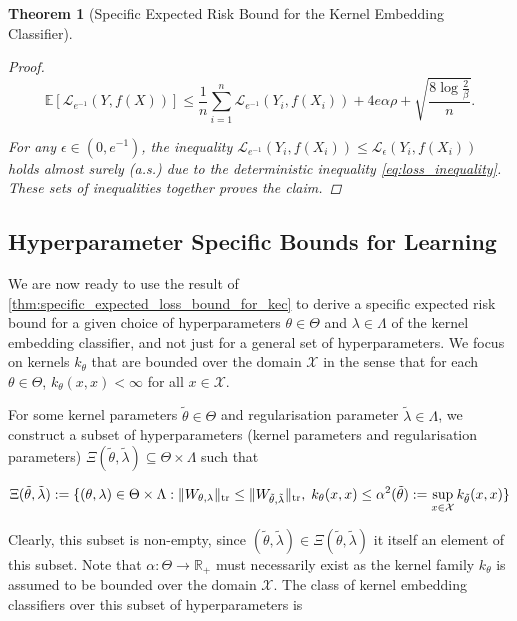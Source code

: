 \documentclass{article}
\newtheorem{theorem}{Theorem}[section]
\begin{document}
\begin{theorem}[Specific Expected Risk Bound for the Kernel Embedding Classifier]
\begin{proof}
				\begin{equation}
					\mathbb{E}[\mathcal{L}_{e^{-1}}(Y, f(X))] \leq \frac{1}{n} \sum_{i = 1}^{n} \mathcal{L}_{e^{-1}}(Y_{i}, f(X_{i})) + 4 e \alpha \rho + \sqrt{\frac{8 \log{\frac{2}{\beta}}}{n}}.
				\end{equation}
				
				For any $\epsilon \in (0, e^{-1})$, the inequality $\mathcal{L}_{e^{-1}}(Y_{i}, f(X_{i})) \leq \mathcal{L}_{\epsilon}(Y_{i}, f(X_{i}))$ holds almost surely (a.s.) due to the deterministic inequality \eqref{eq:loss_inequality}. These sets of inequalities together proves the claim.
			\end{proof}
		\end{theorem}

	\subsection{Hyperparameter Specific Bounds for Learning}
	\label{sec:hyperparamter_bounds}
	
		We are now ready to use the result of \cref{thm:specific_expected_loss_bound_for_kec} to derive a specific expected risk bound for a given choice of hyperparameters $\theta \in \Theta$ and $\lambda \in \Lambda$ of the kernel embedding classifier, and not just for a general set of hyperparameters. We focus on kernels $k_{\theta}$ that are bounded over the domain $\mathcal{X}$ in the sense that for each $\theta \in \Theta$, $k_{\theta}(x, x) < \infty$ for all $x \in \mathcal{X}$.
		
		For some kernel parameters $\tilde{\theta} \in \Theta$ and regularisation parameter $\tilde{\lambda} \in \Lambda$, we construct a subset of hyperparameters (kernel parameters and regularisation parameters) $\Xi(\tilde{\theta}, \tilde{\lambda}) \subseteq \Theta \times \Lambda$ such that

		\begin{equation}
			\Xi(\tilde{\theta}, \tilde{\lambda}) := \{ (\theta, \lambda) \in \Theta \times \Lambda : \| W_{\theta, \lambda} \|_{\mathrm{tr}} \leq \| W_{\tilde{\theta}, \tilde{\lambda}} \|_{\mathrm{tr}}, \; k_{\theta}(x, x) \leq \alpha^{2}(\tilde{\theta}) := \sup_{x \in \mathcal{X}} k_{\tilde{\theta}}(x, x) \} \\
			\label{eq:hyperparameter_subset_definition}
		\end{equation}
		
		Clearly, this subset is non-empty, since $(\tilde{\theta}, \tilde{\lambda}) \in \Xi(\tilde{\theta}, \tilde{\lambda})$ it itself an element of this subset. Note that $\alpha : \Theta \to \mathbb{R}_{+}$ must necessarily exist as the kernel family $k_{\theta}$ is assumed to be bounded over the domain $\mathcal{X}$. The class of kernel embedding classifiers over this subset of hyperparameters is 
		
\end{document}
